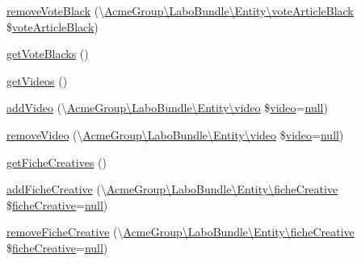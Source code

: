 \begin{DoxyCompactItemize}
\item 
\hyperlink{class_acme_group_1_1_labo_bundle_1_1_entity_1_1article_aad7131187c7d0bc31d075e7570025027}{remove\+Vote\+Black} (\textbackslash{}\hyperlink{class_acme_group_1_1_labo_bundle_1_1_entity_1_1vote_article_black}{Acme\+Group\textbackslash{}\+Labo\+Bundle\textbackslash{}\+Entity\textbackslash{}vote\+Article\+Black} \$\hyperlink{class_acme_group_1_1_labo_bundle_1_1_entity_1_1vote_article_black}{vote\+Article\+Black})
\item 
\hyperlink{class_acme_group_1_1_labo_bundle_1_1_entity_1_1article_a318bdd37219e2a6ec02172ca7d39eaae}{get\+Vote\+Blacks} ()
\item 
\hyperlink{class_acme_group_1_1_labo_bundle_1_1_entity_1_1article_a97d6e4578b8d6237a189a1c7e2d65783}{get\+Videos} ()
\item 
\hyperlink{class_acme_group_1_1_labo_bundle_1_1_entity_1_1article_a3aaa9eef660fb19be502b75bafd29d9d}{add\+Video} (\textbackslash{}\hyperlink{class_acme_group_1_1_labo_bundle_1_1_entity_1_1video}{Acme\+Group\textbackslash{}\+Labo\+Bundle\textbackslash{}\+Entity\textbackslash{}video} \$\hyperlink{class_acme_group_1_1_labo_bundle_1_1_entity_1_1video}{video}=\hyperlink{validate_8js_afb8e110345c45e74478894341ab6b28e}{null})
\item 
\hyperlink{class_acme_group_1_1_labo_bundle_1_1_entity_1_1article_a01f658c3ca9c282348e1a7ff1f730d5c}{remove\+Video} (\textbackslash{}\hyperlink{class_acme_group_1_1_labo_bundle_1_1_entity_1_1video}{Acme\+Group\textbackslash{}\+Labo\+Bundle\textbackslash{}\+Entity\textbackslash{}video} \$\hyperlink{class_acme_group_1_1_labo_bundle_1_1_entity_1_1video}{video}=\hyperlink{validate_8js_afb8e110345c45e74478894341ab6b28e}{null})
\item 
\hyperlink{class_acme_group_1_1_labo_bundle_1_1_entity_1_1article_a3d64ff280ef874c0c382643955887809}{get\+Fiche\+Creatives} ()
\item 
\hyperlink{class_acme_group_1_1_labo_bundle_1_1_entity_1_1article_a1ed2ff65c3f5c5b484be53b857a761db}{add\+Fiche\+Creative} (\textbackslash{}\hyperlink{class_acme_group_1_1_labo_bundle_1_1_entity_1_1fiche_creative}{Acme\+Group\textbackslash{}\+Labo\+Bundle\textbackslash{}\+Entity\textbackslash{}fiche\+Creative} \$\hyperlink{class_acme_group_1_1_labo_bundle_1_1_entity_1_1fiche_creative}{fiche\+Creative}=\hyperlink{validate_8js_afb8e110345c45e74478894341ab6b28e}{null})
\item 
\hyperlink{class_acme_group_1_1_labo_bundle_1_1_entity_1_1article_a6bc9178df51bcf18e270be91afd95ef2}{remove\+Fiche\+Creative} (\textbackslash{}\hyperlink{class_acme_group_1_1_labo_bundle_1_1_entity_1_1fiche_creative}{Acme\+Group\textbackslash{}\+Labo\+Bundle\textbackslash{}\+Entity\textbackslash{}fiche\+Creative} \$\hyperlink{class_acme_group_1_1_labo_bundle_1_1_entity_1_1fiche_creative}{fiche\+Creative}=\hyperlink{validate_8js_afb8e110345c45e74478894341ab6b28e}{null})
\end{DoxyCompactItemize}


